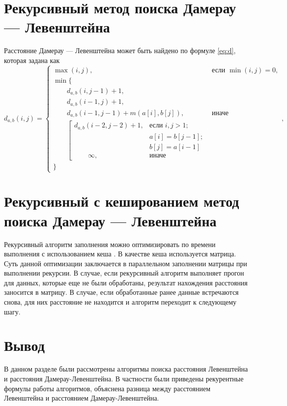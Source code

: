 \section{Рекурсивный метод поиска Дамерау — Левенштейна}
\label{sec:recmat}

Расстояние Дамерау — Левенштейна может быть найдено по формуле \ref{eq:d}, которая задана как
\begin{equation}
	\label{eq:d}
	d_{a,b}(i, j) = \begin{cases}
		\max(i, j), &\text{если }\min(i, j) = 0,\\
		\min \lbrace \\
			\qquad d_{a,b}(i, j-1) + 1,\\
			\qquad d_{a,b}(i-1, j) + 1,\\
			\qquad d_{a,b}(i-1, j-1) + m(a[i], b[j]), &\text{иначе}\\
			\qquad \left[ \begin{array}{cc}d_{a,b}(i-2, j-2) + 1, &\text{если }i,j > 1;\\
			\qquad &\text{}a[i] = b[j-1]; \\
			\qquad &\text{}b[j] = a[i-1]\\
			\qquad \infty, & \text{иначе}\end{array}\right.\\
		\rbrace
		\end{cases},
\end{equation}

\section{Рекурсивный с кешированием метод поиска Дамерау — Левенштейна}

Рекурсивный алгоритм заполнения можно оптимизировать по времени выполнения с использованием кеша \cite{cache}. В качестве кеша используется матрица. Суть данной оптимизации заключается в параллельном заполнении матрицы при выполнении рекурсии. 
В случае, если рекурсивный алгоритм выполняет прогон для данных, которые еще не были обработаны, результат нахождения расстояния заносится в матрицу. В случае, если обработанные ранее данные встречаются снова, для них расстояние не находится и алгоритм переходит к следующему шагу.


\section*{Вывод}

В данном разделе были рассмотрены алгоритмы поиска расстояния Левенштейна и расстояния Дамерау-Левенштейна. В частности были приведены рекурентные формулы работы алгоритмов, объяснена разница между расстоянием Левенштейна и расстоянием Дамерау-Левенштейна.

